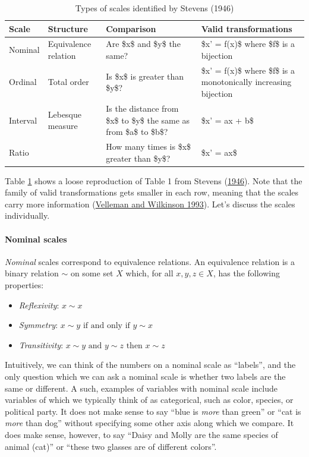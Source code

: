 \documentclass[
]{book}
\providecommand{\tightlist}{%
  \setlength{\itemsep}{0pt}\setlength{\parskip}{0pt}}
\theoremstyle{definition}
\theoremstyle{definition}
\theoremstyle{definition}
\theoremstyle{definition}
\theoremstyle{remark}
\begin{document}
\begin{table}

\caption{\label{tab:scales}Types of scales identified by Stevens (1946)}
\centering
\begin{tabular}[t]{l|l|l|l}
\hline
Scale & Structure & Comparison & Valid transformations\\
\hline
Nominal & Equivalence relation & Are \$x\$ and \$y\$ the same? & \$x' = f(x)\$ where \$f\$ is a bijection\\
\hline
Ordinal & Total order & Is \$x\$ is greater than \$y\$? & \$x' = f(x)\$ where \$f\$ is a monotonically increasing bijection\\
\hline
Interval & Lebesque measure & Is the distance from \$x\$ to \$y\$ the same as from \$a\$ to \$b\$? & \$x' = ax + b\$\\
\hline
Ratio &  & How many times is \$x\$ greater than \$y\$? & \$x' = ax\$\\
\hline
\end{tabular}
\end{table}

Table \ref{tab:scales} shows a loose reproduction of Table 1 from Stevens (\protect\hyperlink{ref-stevens1946}{1946}). Note that the family of valid transformations gets smaller in each row, meaning that the scales carry more information (\protect\hyperlink{ref-velleman1993}{Velleman and Wilkinson 1993}). Let's discuss the scales individually.

\hypertarget{nominal-scales}{%
\paragraph{Nominal scales}\label{nominal-scales}}

\emph{Nominal} scales correspond to equivalence relations. An equivalence relation is a binary relation \(\sim\) on some set \(X\) which, for all \(x, y, z \in X\), has the following properties:

\begin{itemize}
\tightlist
\item
  \emph{Reflexivity}: \(x \sim x\)
\item
  \emph{Symmetry}: \(x \sim y \text{ if and only if } y \sim x\)
\item
  \emph{Transitivity}: \(x \sim y \text{ and } y \sim z \text{ then } x \sim z\)
\end{itemize}

Intuitively, we can think of the numbers on a nominal scale as ``labels'', and the only question which we can ask a nominal scale is whether two labels are the same or different. A such, examples of variables with nominal scale include variables of which we typically think of as categorical, such as color, species, or political party. It does not make sense to say ``blue is \emph{more} than green'' or ``cat is \emph{more} than dog'' without specifying some other axis along which we compare. It does make sense, however, to say ``Daisy and Molly are the same species of animal (cat)'' or ``these two glasses are of different colors''.
\end{document}
